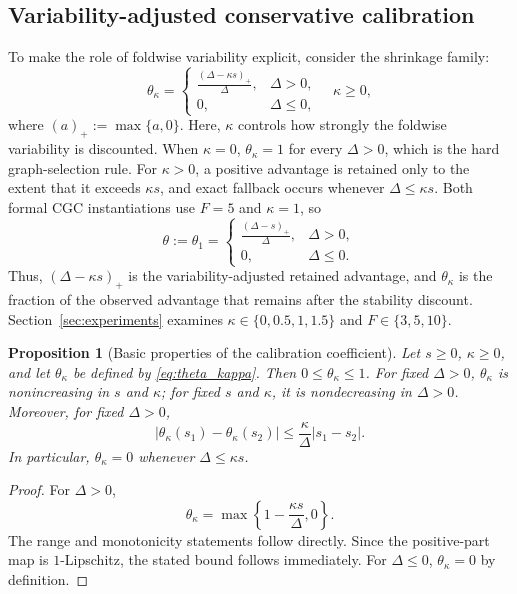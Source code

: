 \documentclass[11pt]{article}
\newtheorem{proposition}{Proposition}
\theoremstyle{remark}
\begin{document}
\subsection{Variability-adjusted conservative calibration}

To make the role of foldwise variability explicit,  consider the shrinkage family:
\begin{equation}
\label{eq:theta_kappa}
\theta_{\kappa}=
\begin{cases}
\displaystyle\frac{(\Delta-\kappa s)_{+}}{\Delta},&\Delta>0,\\[1mm]
0,&\Delta\le0,
\end{cases}
\quad \kappa\ge0,
\end{equation}
where $(a)_{+}:=\max\{a,0\}$.
Here, \(\kappa\) controls how strongly the foldwise variability is
discounted. When $\kappa=0$, $\theta_{\kappa}=1$ for every $\Delta>0$, which is the hard graph-selection rule. For $\kappa>0$, a positive advantage is retained only to the extent that it exceeds $\kappa s$, and exact fallback occurs whenever $\Delta\le\kappa s$. Both formal CGC instantiations use $F=5$ and $\kappa=1$, so
\begin{equation}
\label{eq:theta}
\theta:=\theta_1=
\begin{cases}
\displaystyle\frac{(\Delta-s)_{+}}{\Delta},&\Delta>0,\\[2mm]
0,&\Delta\le0.
\end{cases}
\end{equation}
Thus, \((\Delta-\kappa s)_{+}\) is the variability-adjusted retained advantage, and $\theta_\kappa$ is the fraction of the observed advantage that remains after the stability discount. Section~\ref{sec:experiments} examines $\kappa\in\{0,0.5,1,1.5\}$ and $F\in\{3,5,10\}$.

\begin{proposition}[Basic properties of the calibration coefficient]
\label{prop:theta_properties}
Let $s\ge0$, $\kappa\ge0$, and let $\theta_\kappa$ be defined by \eqref{eq:theta_kappa}. Then $0\le\theta_\kappa\le1$. For fixed $\Delta>0$, $\theta_\kappa$ is nonincreasing in $s$ and $\kappa$; for fixed $s$ and $\kappa$, it is nondecreasing in $\Delta>0$. Moreover, for fixed $\Delta>0$,
\[
|\theta_\kappa(s_1)-\theta_\kappa(s_2)|
\le \frac{\kappa}{\Delta}|s_1-s_2|.
\]
In particular, $\theta_\kappa=0$ whenever $\Delta\le\kappa s$.
\end{proposition}

\begin{proof}
For $\Delta>0$,
\[
\theta_\kappa=\max\!\left\{1-\frac{\kappa s}{\Delta},0\right\}.
\]
The range and monotonicity statements follow directly. Since the positive-part map is $1$-Lipschitz, the stated bound follows immediately. For $\Delta\le0$, $\theta_\kappa=0$ by definition.
\end{proof}
\end{document}
